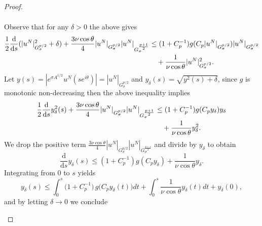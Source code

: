 \documentclass[12pt]{article}
\theoremstyle{plain}
\theoremstyle{remark}
\newcommand{\dd}{\mathrm{d}}
\newcommand{\Gspace}{G_\sigma^{p/2}}
\begin{document}
\begin{proof}
\begin{enumerate}
\begin{align*}
\end{align*}
Observe that for any $\delta>0$ the above gives
\begin{align*}
  \frac{1}{2} \frac{\dd}{\dd s} (|u^N|_{G_\sigma^{p/2}}^2+\delta)+ \frac{3\nu \cos\theta}{4} |u^N|_{G_\sigma^{p/2}}|u^N|_{G_\sigma^{\frac{p+1}{2}}} & \leq (1+C_p^{-1})g(C_p |u^N|_{G_\sigma^{p/2}})|u^N|_{G_\sigma^{p/2}}\notag \\&\quad+\frac{1}{\nu \cos\theta}|u^N|_{G_\sigma^{p/2}}^2. 
\end{align*}
Let $y(s)=|e^{\sigma A^{1/2}} u^N(s e^{i\theta})|=|u^N|_{\Gspace}$ and $y_\delta(s)=\sqrt{y^2(s)+\delta}$, since $g$ is monotonic non-decreasing then the above inequality implies 
\begin{align*}
  \frac{1}{2} \frac{\dd}{\dd s} y^2_\delta (s)+ \frac{3\nu \cos\theta}{4} |u^N|_{G_\sigma^{p/2}}|u^N|_{G_\sigma^{\frac{p+1}{2}}} & \leq (1+C_p^{-1})g(C_p y_\delta )y_\delta \notag \\&\quad+\frac{1}{\nu \cos\theta}y_\delta^2. 
\end{align*}
We drop the positive term $\frac{3\nu \cos\theta}{4} |u^N|_{G_\sigma^{p/2}}|u^N|_{G_\sigma^{\frac{p+1}{2}}}$ and divide by $y_\delta$ to obtain
$$
\frac{\dd}{\dd s} y_\delta (s)  \leq (1+C_p^{-1})g(C_p y_\delta ) +\frac{1}{\nu \cos\theta}y_\delta. 
$$
Integrating from $0$ to $s$ yields
$$
    y_\delta(s) \leq \int_0^s  \!\bigl(1 + C_p^{-1}\bigr)\,
    g \bigl(C_p  y_\delta(t)\bigl) dt+ \int_0^s  \frac{1}{\nu \cos\theta}  y_\delta(t)dt
    + y_\delta(0),
$$
and by letting $\delta \to 0$ we conclude


\end{enumerate}
\end{proof}
\end{document}
